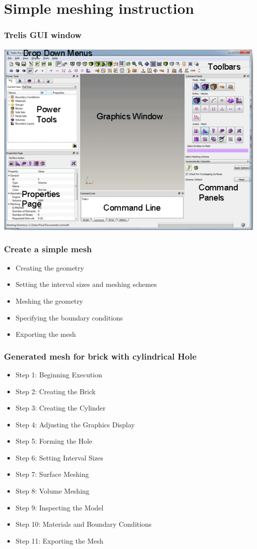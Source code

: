\documentclass[fleqn]{beamer}
\begin{document}
\section{Simple meshing instruction}
\begin{frame}
        \frametitle{Trelis GUI window}
        \begin{center}
            \includegraphics[trim=.1cm .25cm 2.0cm .4cm, clip=true, totalheight=.8\textheight]{figures/gui_window.png}
        \end{center}
\end{frame}

\begin{frame}
\frametitle{Create a simple mesh}
\begin{itemize}
 \item Creating the geometry
 \item Setting the interval sizes and meshing schemes
 \item Meshing the geometry
 \item Specifying the boundary conditions
 \item Exporting the mesh
\end{itemize}
\end{frame}

\begin{frame}
 \frametitle{Generated mesh for brick with cylindrical Hole}
 \begin{itemize}
  \item Step 1: Beginning Execution
  \item Step 2: Creating the Brick
  \item Step 3: Creating the Cylinder
  \item Step 4: Adjusting the Graphics Display
  \item Step 5: Forming the Hole
  \item Step 6: Setting Interval Sizes
  \item Step 7: Surface Meshing
  \item Step 8: Volume Meshing
  \item Step 9: Inspecting the Model
  \item Step 10: Materials and Boundary Conditions
  \item Step 11: Exporting the Mesh
 \end{itemize}
\end{frame}
\end{document}
